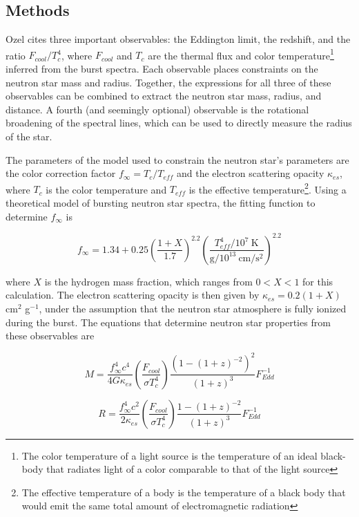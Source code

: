 \documentclass[onecolumn]{aastex63}
\begin{document}
\subsection{Methods}

Ozel cites three important observables: the Eddington limit, the redshift, and the ratio $F_{cool}/T_c^4$, where $F_{cool}$ and $T_c$ are the thermal flux and color temperature\footnote{The color temperature of a light source is the temperature of an ideal black-body that radiates light of a color comparable to that of the light source} inferred from the burst spectra. Each observable places constraints on the neutron star mass and radius. Together, the expressions for all three of these observables can be combined to extract the neutron star mass, radius, and distance. A fourth (and seemingly optional) observable is the rotational broadening of the spectral lines, which can be used to directly measure the radius of the star.

The parameters of the model used to constrain the neutron star's parameters are the color correction factor $f_\infty = T_c / T_{eff}$ and the electron scattering opacity $\kappa_{es}$, where $T_c$ is the color temperature and $T_{eff}$ is the effective temperature\footnote{The effective temperature of a body is the temperature of a black body that would emit the same total amount of electromagnetic radiation}. Using a theoretical model of bursting neutron star spectra, the fitting function to determine $f_\infty$ is 

\begin{equation}
    f_\infty = 1.34 + 0.25\left(\frac{1 + X}{1.7}\right)^{2.2} \left(\frac{T_{eff}^4 / 10^7\ \textrm{K}}{\textrm{g} / 10^{13}\ \textrm{cm}/\textrm{s}^2}\right)^{2.2}
\end{equation}

where $X$ is the hydrogen mass fraction, which ranges from $0 < X < 1$ for this calculation. The electron scattering opacity is then given by $\kappa_{es} = 0.2(1 + X)$ cm$^2$ g$^{-1}$, under the assumption that the neutron star atmosphere is fully ionized during the burst. The equations that determine neutron star properties from these observables are

\begin{equation} \label{mass}
    M = \frac{f_\infty^4 c^4}{4G\kappa_{es}} \left(\frac{F_{cool}}{\sigma T_c^4}\right) \frac{(1 - (1 + z)^{-2})^2}{(1 + z)^3} F_{Edd}^{-1}
\end{equation}

\begin{equation} \label{radius}
    R = \frac{f_\infty^4 c^2}{2\kappa_{es}} \left(\frac{F_{cool}}{\sigma T_c^4}\right) \frac{1 - (1 + z)^{-2}}{(1 + z)^3} F_{Edd}^{-1}
\end{equation}
\end{document}
